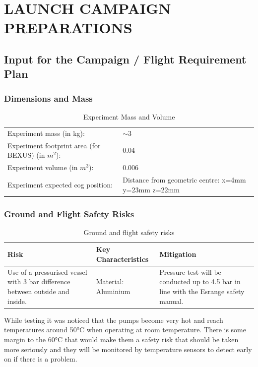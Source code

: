 \chapter{LAUNCH CAMPAIGN PREPARATIONS}
\label{sec:campaign_preparations}
\section{Input for the Campaign / Flight Requirement Plan}
\label{sec:input_FRP}

\subsection{Dimensions and Mass}

\begin{table}[htbp]
\centering
\caption{Experiment Mass and Volume}
\label{tab:mass_volume}
\begin{tabular}{L{6cm}L{6cm}}
\toprule
Experiment mass (in kg): & $\sim$3\\
Experiment footprint area (for BEXUS) (in $m^2$): & 0.04\\
Experiment volume (in $m^3$): & 0.006\\
Experiment expected \gls{cog} position: & Distance from geometric centre: x=4mm y=23mm z=22mm \\
\bottomrule
\end{tabular}
\end{table}
\clearpage 

\subsection{Ground and Flight Safety Risks}

\begin{table}[htbp]
\centering
\caption{Ground and flight safety risks}
\label{tab:safety_risks}
\begin{tabular}{p{4cm} p{5cm} p{4cm}}
\toprule
\textbf{Risk} & \textbf{Key Characteristics} & \textbf{Mitigation} \\
\midrule
Use of a pressurised vessel with 3 bar difference between outside and inside. & Material: Aluminium & Pressure test will be conducted up to 4.5 bar in line with the Esrange safety manual. \\
\bottomrule
\end{tabular}
\end{table}
While testing it was noticed that the pumps become very hot and reach temperatures around 50°C when operating at room temperature. There is some margin to the 60°C that would make them a safety risk that should be taken more seriously and they will be monitored by temperature sensors to detect early on if there is a problem.
\clearpage

